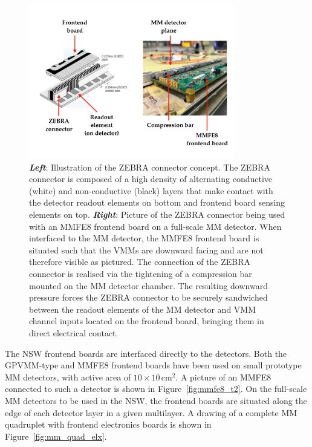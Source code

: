 \begin{figure}[!htb]
    \begin{center}
        \includegraphics[width=0.8\textwidth]{figures/nsw/frontend/zebra_connector_illustratedPDF}
        \caption{
            \textbf{\textit{Left}}: Illustration of the ZEBRA connector concept.
                The ZEBRA connector is composed of a high density of alternating conductive (white) and non-conductive (black) layers
                that make contact with the detector readout elements on bottom and frontend board sensing elements
                on top.
            \textbf{\textit{Right}}: Picture of the ZEBRA connector being used with an MMFE8 frontend board
                on a full-scale MM detector.
                When interfaced to the MM detector, the MMFE8 frontend board is situated such that the VMMs are downward facing and
                are not therefore visible as pictured.
                The connection of the ZEBRA connector is realised via the tightening of a compression bar mounted on the MM detector chamber.
                The resulting
                downward pressure forces the ZEBRA connector to be securely sandwiched between
                the readout elements of the MM detector and VMM channel inputs located on the frontend board, bringing them in direct electrical contact.
        }
        \label{fig:zebra_connector}
    \end{center}
\end{figure}

The NSW frontend boards are interfaced directly to the detectors.
Both the GPVMM-type and MMFE8 frontend boards have been used on small prototype MM detectors, with
active area of $10\times10$\,cm$^2$.
A picture of an MMFE8 connected to such a detector is shown in Figure~\ref{fig:mmfe8_t2}.
On the full-scale MM detectors to be used in the NSW, the frontend boards are situated along the edge
of each detector layer in a given multilayer.
A drawing of a complete MM quadruplet with frontend electronics boards is shown in Figure~\ref{fig:mm_quad_elx}.


